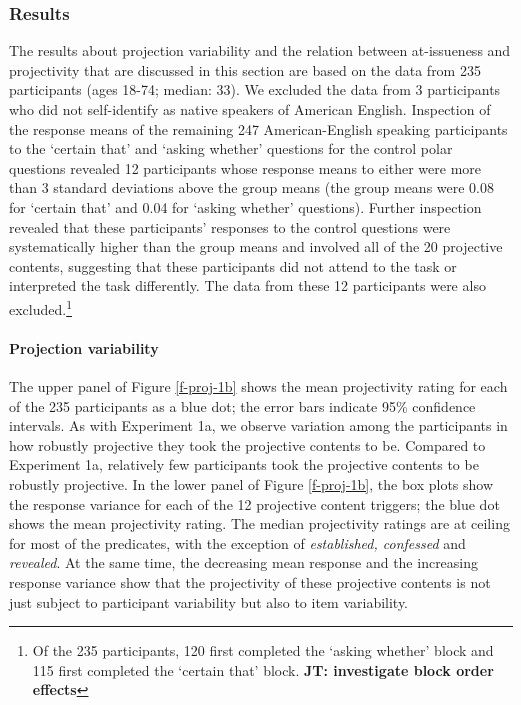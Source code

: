 \documentclass[11pt,fleqn]{article}
\newcommand{\6}{\mbox{$[\hspace*{-.6mm}[$}}
\newcommand{\9}{\mbox{$]\hspace*{-.6mm}]$}}
\newcommand{\jt}[1]{\textbf{\color{blue}JT: #1}}
\begin{document}
\subsubsection{Results}

The results about projection variability and the relation between at-issueness and projectivity that are discussed in this section are based on the data from 235 participants (ages 18-74; median: 33). We excluded the data from 3 participants who did not self-identify as native speakers of American English. Inspection of the response means of the remaining 247 American-English speaking participants to the `certain that' and `asking whether' questions for the control polar questions revealed 12 participants whose response means to either were more than 3 standard deviations above the group means (the group means were 0.08 for `certain that' and 0.04 for `asking whether' questions). Further inspection revealed that these participants' responses to the control questions were systematically higher than the group means and involved all of the 20 projective contents, suggesting that these participants did not attend to the task or interpreted the task differently. The data from these 12 participants were also excluded.\footnote{Of the 235 participants, 120 first completed the `asking whether' block and 115 first completed the `certain that' block. \jt{investigate block order effects}}

\paragraph{Projection variability} The upper panel of Figure \ref{f-proj-1b} shows the mean projectivity rating for each of the 235 participants as a blue dot; the error bars indicate 95\% confidence intervals. As with Experiment 1a, we observe variation among the participants in how robustly projective they took the projective contents to be. Compared to Experiment 1a, relatively few participants took the projective contents to be robustly projective. In the lower panel of Figure \ref{f-proj-1b}, the box plots show the response variance for each of the 12 projective content triggers; the blue dot shows the mean projectivity rating. The median projectivity ratings are at ceiling for most of the predicates, with the exception of {\em established, confessed} and {\em revealed}. At the same time, the decreasing mean response and the increasing response variance show that the projectivity of these projective contents is not just subject to participant variability but also to item variability.
\end{document}
